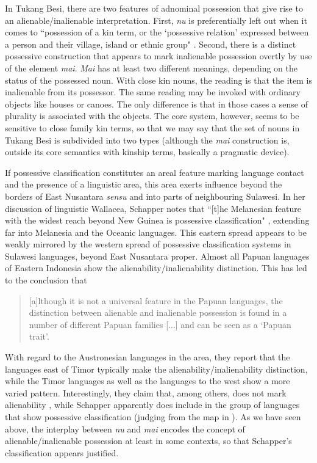 In Tukang Besi, there are two features of adnominal possession that give rise to an alienable/inalienable interpretation. First, \textit{nu} is preferentially left out when it comes to ``possession of a kin term, or the `possessive relation' expressed between a person and their village, island or ethnic group" \citep[346]{donohue1999}. Second, there is a distinct possessive construction that appears to mark inalienable possession overtly by use of the element \textit{mai}. \textit{Mai} has at least two different meanings, depending on the status of the possessed noun. With close kin nouns, the reading is that the item is inalienable from its possessor. The same reading may be invoked with ordinary objects like houses or canoes. The only difference is that in those cases a sense of plurality is associated with the objects. The core system, however, seems to be sensitive to close family kin terms, so that we may say that the set of nouns in Tukang Besi is subdivided into two types (although the \textit{mai} construction is, outside its core semantics with kinship terms, basically a pragmatic device). 

If possessive classification constitutes an areal feature marking language contact and the presence of a linguistic area, this area exerts influence beyond the borders of East Nusantara \textit{sensu} \citet{klamer2008east} and into parts of neighbouring Sulawesi. In her discussion of linguistic Wallacea, Schapper notes that ``[t]he Melanesian feature with the widest reach beyond New Guinea is possessive classification" \citep[108]{schapper2015wallacea}, extending far into Melanesia and the Oceanic languages. This eastern spread appears to be weakly mirrored by the western spread of possessive classification systems in Sulawesi languages, beyond East Nusantara proper. Almost all Papuan languages of Eastern Indonesia show the alienability/inalienability distinction. This has led \citet[120]{klamer2008east} to the conclusion that

\begin{quote}[a]lthough it is not a universal feature in the Papuan languages,
the distinction between alienable and inalienable possession is found in a number of different Papuan families [...] and can be seen as a `Papuan trait’.\end{quote}

With regard to the Austronesian languages in the area, they report that the languages east of Timor typically make the alienability/inalienability distinction, while the Timor languages as well as the languages to the west show a more varied pattern. Interestingly, they claim that, among others,  does not mark alienability \citep[120]{klamer2008east}, while Schapper apparently does include  in the group of languages that show possessive classification (judging from the map in \citealt[110]{schapper2009bunaq}). As we have seen above, the interplay between \textit{nu} and \textit{mai} encodes the concept of alienable/inalienable possession at least in some contexts, so that Schapper's classification appears justified.

